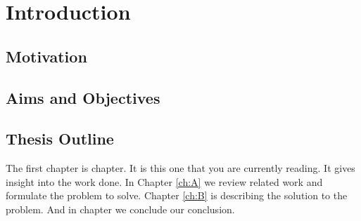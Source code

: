 \chapter{Introduction}\label{ch:intro}
\section{Motivation}
\section{Aims and Objectives}
\section{Thesis Outline}
The first chapter is  chapter. It is this one that you are currently reading. It gives insight into the work done. In Chapter \ref{ch:A} we review related work and formulate the problem to solve. Chapter \ref{ch:B} is describing the solution to the problem. And in  chapter we conclude our conclusion.